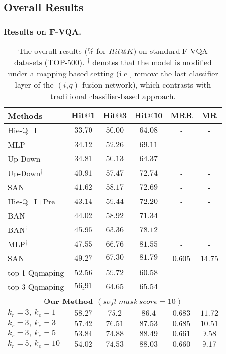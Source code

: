 \documentclass[runningheads]{llncs}
\begin{document}
\subsection{Overall Results }\label{sec:Overall Results}
\subsubsection{Results on F-VQA.}
\setlength{\tabcolsep}{7pt}
\begin{table}[htbp]
\scriptsize
\caption{The overall results (\% for $Hit@K$) on standard F-VQA datasets (TOP-$500$). $^\dag$ denotes that the model is modified under a mapping-based setting (i.e., remove the last classifier layer of the $(i,q)$ fusion network), which contrasts with traditional classifier-based approach.}
\label{tab:Overall Results of General}
\centering
\begin{tabular}{l|ccccc}
 \toprule
\multirow{1}{*}{{\bf \quad   Methods }}                        
& {\bf $\bm{Hit@1}$}
& $\bm{Hit@3}$
& $\bm{Hit@10}$
& $\bm{MRR}$
& $\bm{MR}$
\\ 
 \midrule
\quad Hie-Q+I \cite{DBLP:conf/nips/LuYBP16}		& $33.70$ & $50.00$  & $64.08$ & - & - \\
\quad MLP			& $34.12$ & $52.26$  & $69.11$ & - & - \\ 	
\quad Up-Down \cite{DBLP:conf/cvpr/00010BT0GZ18} 	& $34.81$ & $50.13$  & $64.37$ & - & - \\
\quad Up-Down$^\dag$ & $40.91$ & $57.47$  & $72.74$  & - & - \\  	
\quad SAN \cite{DBLP:conf/cvpr/YangHGDS16}		& $41.62$ & $58.17$  & $72.69$ & - & - \\
\quad Hie-Q+I+Pre \cite{DBLP:conf/nips/LuYBP16}	& $43.14$ & $59.44$  & $72.20$ & - & - \\	 
\quad BAN \cite{DBLP:conf/nips/KimJZ18}			& $44.02$ & $58.92$  & $71.34 $ & - & - \\ 	 
\quad BAN$^\dag$ & $45.95$ & $63.36$  & $78.12$  & - & - \\
\quad MLP$^\dag$ & $47.55$ & $66.76$  & $81.55$  & - & - \\
\quad SAN$^\dag$ & $49.27$ & $\underline{67.30}$  & $\underline{81.79}$ & 0.605 & 14.75 \\   	 	 	 
\quad top-1-Qqmaping \cite{DBLP:journals/pami/WangWSDH18}	& $52.56$ & $59.72$  & $60.58$ & - & - \\
\quad top-3-Qqmaping \cite{DBLP:journals/pami/WangWSDH18}	& $\underline{56.91}$ & $64.65$  & $65.54$ & - & - \\	 	 
\midrule
\multicolumn{6}{c}{\bf Our Method $(soft~mask~score=10)$}\\
\midrule
\quad $k_r=3,~k_e=1$ & $\bm{58.27}$  & $75.2$   & $86.4$  & $0.683 $ & $11.72$ \\			 	
\quad $k_r=3,~k_e=3$ & $57.42$  & $\bm{76.51}$   & $87.53$  & $\bm{0.685}$ & $10.51$ \\			 	
\quad $k_r=3,~k_e=5$ & $53.84$  & $74.88$   & $\bm{88.49}$  & $0.661$ & $9.58$ \\ 			 	
\quad $k_r=5,~k_e=10$ & $54.02$  & $74.53$   & $88.03$  & $0.660$ & $\bm{9.17}$ \\ 			 	
\bottomrule 
\end{tabular}
\end{table}
\end{document}

